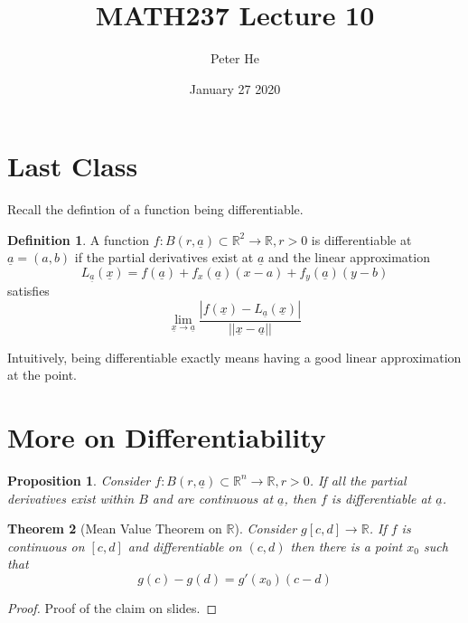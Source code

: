 \documentclass[12pt]{article}
\title{MATH237 Lecture 10}
\author{Peter He}
\date{January 27 2020}
\newtheorem{theorem}{Theorem}
\newtheorem{proposition}[theorem]{Proposition}
\theoremstyle{definition}
\newtheorem{definition}{Definition}[section]
\newcommand{\R}{\mathbb{R}}
\begin{document}
\maketitle

\section{Last Class}
Recall the defintion of a function being differentiable.
\begin{definition}
    A function $f:B(r,\underline a)\subset \R^2\to\R, r>0$ is differentiable at $\underline a=(a,b)$ if the partial derivatives exist at $\underline a$ and the linear approximation \[L_{\underline a}(\underline x)=f(\underline a)+f_x(\underline a)(x-a)+f_y(\underline a)(y-b)\] satisfies \[\lim_{\underline x\to \underline a}\frac{|f(\underline x)-L_{\underline a}(\underline x)|}{||\underline x-\underline a||}\]
\end{definition}
Intuitively, being differentiable exactly means having a good linear approximation at the point.
\section{More on Differentiability}
\begin{proposition}
    Consider $f:B(r,\underline a)\subset\R^n\to\R, r>0$. If all the partial derivatives exist within $B$ and are continuous at $\underline a$, then $f$ is differentiable at $\underline a$.
\end{proposition}
\begin{theorem}[Mean Value Theorem on $\R$]
    Consider $g[c,d]\to\R$. If $f$ is continuous on $[c,d]$ and differentiable on $(c,d)$ then there is a point $x_0$ such that \[g(c)-g(d)=g'(x_0)(c-d)\]
\end{theorem}

\begin{proof}
    Proof of the claim on slides.
\end{proof}
\end{document}
